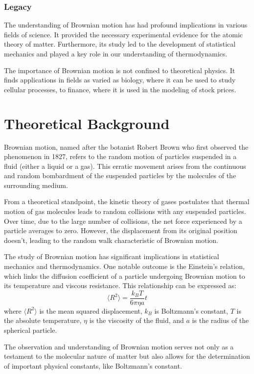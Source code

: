 \documentclass[10pt,letterpaper,onecolumn]{article}
\begin{document}
\subsubsection{Legacy}
The understanding of Brownian motion has had profound implications in various fields of science. It provided the necessary experimental evidence for the atomic theory of matter. Furthermore, its study led to the development of statistical mechanics and played a key role in our understanding of thermodynamics.

The importance of Brownian motion is not confined to theoretical physics. It finds applications in fields as varied as biology, where it can be used to study cellular processes, to finance, where it is used in the modeling of stock prices.


\section{Theoretical Background}

Brownian motion, named after the botanist Robert Brown who first observed the phenomenon in 1827, refers to the random motion of particles suspended in a fluid (either a liquid or a gas). This erratic movement arises from the continuous and random bombardment of the suspended particles by the molecules of the surrounding medium.

From a theoretical standpoint, the kinetic theory of gases postulates that thermal motion of gas molecules leads to random collisions with any suspended particles. Over time, due to the large number of collisions, the net force experienced by a particle averages to zero. However, the displacement from its original position doesn't, leading to the random walk characteristic of Brownian motion.

The study of Brownian motion has significant implications in statistical mechanics and thermodynamics. One notable outcome is the Einstein's relation, which links the diffusion coefficient of a particle undergoing Brownian motion to its temperature and viscous resistance. This relationship can be expressed as:
\[ \langle R^2 \rangle  = \frac{k_B T}{6 \pi \eta a}t \]
where \( \langle R^2 \rangle \) is the  mean squared displacement, \( k_B \) is Boltzmann's constant, \( T \) is the absolute temperature, \( \eta \) is the viscosity of the fluid, and \( a \) is the radius of the spherical particle.

The observation and understanding of Brownian motion serves not only as a testament to the molecular nature of matter but also allows for the determination of important physical constants, like Boltzmann's constant.
\end{document}
